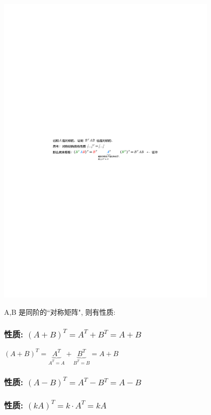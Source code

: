 \documentclass[UTF8]{ctexart}
\begin{document}
\begin{myEnvSample}
	\includegraphics[width=0.8\textwidth]{img/0022.pdf}
\end{myEnvSample}





A,B 是同阶的``对称矩阵", 则有性质: 

\subsubsection{性质: $\left( A+B \right) ^T=A^T+B^T=A+B$ }

$
\left( A+B \right) ^T=\underset{A^T=A}{\underbrace{A^T}}+\underset{B^T=B}{\underbrace{B^T}}=A+B
$


\subsubsection{性质: $\left( A-B \right) ^T=A^T-B^T=A-B$ }


\subsubsection{性质: $\left( kA \right) ^T=k\cdot A^T=kA$ }
\end{document}
